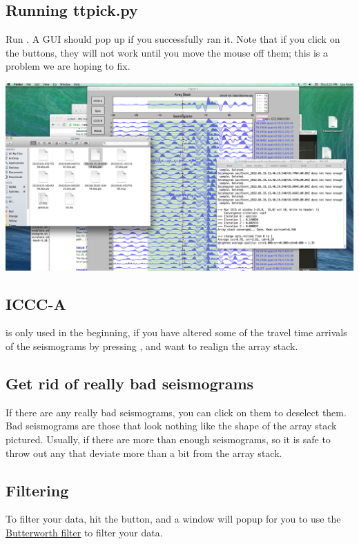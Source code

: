 \documentclass[letterpaper,10pt,english]{sphinxmanual}
\begin{document}
\subsection{Running ttpick.py}
\label{docfiles/PickingTravelTimes:running-ttpick-py}
Run . A GUI should pop up if you successfully ran it. Note that if you click on the buttons, they will not work until you move the mouse off them; this is a problem we are hoping to fix.

\includegraphics{pick_travel_times.png}


\subsection{ICCC-A}
\label{docfiles/PickingTravelTimes:iccc-a}
 is only used in the beginning, if you have altered some of the travel time arrivals of the seismograms by pressing , and want to realign the array stack.


\subsection{Get rid of really bad seismograms}
\label{docfiles/PickingTravelTimes:get-rid-of-really-bad-seismograms}
If there are any really bad seismograms, you can click on them to deselect them. Bad seismograms are those that look nothing like the shape of the array stack pictured. Usually, if there are more than enough seismograms, so it is safe to throw out any that deviate more than a bit from the array stack.


\subsection{Filtering}
\label{docfiles/PickingTravelTimes:filtering}
To filter your data, hit the  button, and a window will popup for you to use the \href{http://en.wikipedia.org/wiki/Butterworth\_filter}{Butterworth filter} to filter your data.
\end{document}
